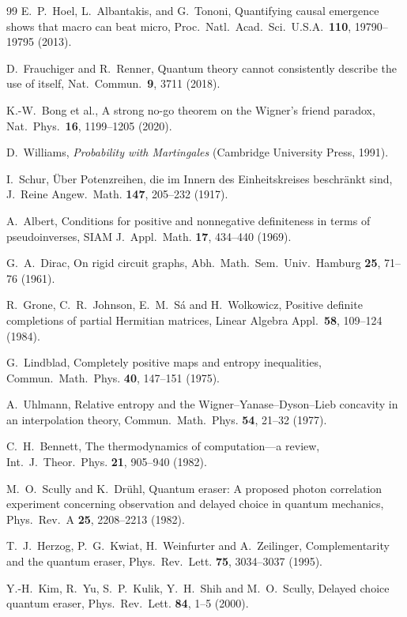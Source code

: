 \documentclass[aps,pra,onecolumn,superscriptaddress,nofootinbib,10pt]{revtex4-2}
\theoremstyle{definition}
\theoremstyle{remark}
\begin{document}
\begin{thebibliography}{99}
 E.~P.~Hoel, L.~Albantakis, and G.~Tononi, Quantifying causal emergence shows that macro can beat micro, Proc.\ Natl.\ Acad.\ Sci.\ U.S.A.\ \textbf{110}, 19790--19795 (2013).

 D.~Frauchiger and R.~Renner, Quantum theory cannot consistently describe the use of itself, Nat.\ Commun.\ \textbf{9}, 3711 (2018).

 K.-W.~Bong et al., A strong no-go theorem on the Wigner's friend paradox, Nat.\ Phys.\ \textbf{16}, 1199--1205 (2020).

 D.~Williams, \emph{Probability with Martingales} (Cambridge University Press, 1991).

 I.~Schur, \"Uber Potenzreihen, die im Innern des Einheitskreises beschr\"ankt sind, J.\ Reine Angew.\ Math. \textbf{147}, 205--232 (1917).

 A.~Albert, Conditions for positive and nonnegative definiteness in terms of pseudoinverses, SIAM J.\ Appl.\ Math. \textbf{17}, 434--440 (1969).

 G.~A.~Dirac, On rigid circuit graphs, Abh.\ Math.\ Sem.\ Univ.\ Hamburg \textbf{25}, 71--76 (1961).

 R.~Grone, C.~R.~Johnson, E.~M.~S\'a and H.~Wolkowicz, Positive definite completions of partial Hermitian matrices, Linear Algebra Appl.\ \textbf{58}, 109--124 (1984).

 G.~Lindblad, Completely positive maps and entropy inequalities, Commun.\ Math.\ Phys. \textbf{40}, 147--151 (1975).

 A.~Uhlmann, Relative entropy and the Wigner--Yanase--Dyson--Lieb concavity in an interpolation theory, Commun.\ Math.\ Phys. \textbf{54}, 21--32 (1977).

 C.~H.~Bennett, The thermodynamics of computation---a review, Int.\ J.\ Theor.\ Phys. \textbf{21}, 905--940 (1982).

 M.~O.~Scully and K.~Dr\"uhl, Quantum eraser: A proposed photon correlation experiment concerning observation and delayed choice in quantum mechanics, Phys.\ Rev.\ A \textbf{25}, 2208--2213 (1982).

 T.~J.~Herzog, P.~G.~Kwiat, H.~Weinfurter and A.~Zeilinger, Complementarity and the quantum eraser, Phys.\ Rev.\ Lett. \textbf{75}, 3034--3037 (1995).

 Y.-H.~Kim, R.~Yu, S.~P.~Kulik, Y.~H.~Shih and M.~O.~Scully, Delayed choice quantum eraser, Phys.\ Rev.\ Lett. \textbf{84}, 1--5 (2000).


\end{thebibliography}
\end{document}

